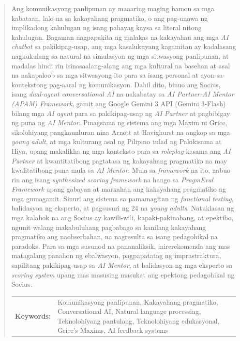 \renewcommand{\abstractname}{Abstrak}
\begin{abstract}

Ang komunikasyong panlipunan ay maaaring maging hamon sa mga kabataan, lalo na sa kakayahang pragmatiko, 
o ang pag-unawa ng implikadong kahulugan ng isang pahayag kaysa sa literal nitong kahulugan. Bagaman 
nagpapakita ng malakas na kakayahan ang mga \textit{AI chatbot} sa pakikipag-usap, ang mga kasalukuyang 
kagamitan ay kadalasang nagkukulang sa natural na simulasyon ng mga sitwasyong panlipunan, at madalas 
hindi rin isinasaalang-alang ang mga kultural na basehan at asal na nakapaloob sa mga sitwasyong ito 
para sa isang personal at ayon-sa-kontekstong pag-aaral ng komunikasyon. Dahil dito, binuo ang Socius, 
isang \textit{dual-agent conversational AI} na nakabatay sa \textit{AI Partner-AI Mentor (APAM) Framework}, 
gamit ang Google Gemini 3 API (Gemini 3-Flash) bilang mga \textit{AI agent} para sa pakikipag-usap 
ng \textit{AI Partner} at pagbibigay ng puna ng \textit{AI Mentor}. Pinagsama ng sistema ang mga Maxim 
ni Grice, sikolohiyang pangkaunluran nina Arnett at Havighurst na angkop sa mga \textit{young adult}, at 
mga kulturang asal ng Pilipino tulad ng Pakikisama at Hiya, upang makalikha ng mga konteksto para 
sa \textit{roleplay} kasama ang \textit{AI Partner} at kwantitatibong pagtatasa ng kakayahang pragmatiko 
na may kwalitatibong puna mula sa \textit{AI Mentor}. Mula sa \textit{framework} na ito, nabuo rin ang 
isang \textit{synthesized scoring framework} na hango sa \textit{PragmEval Framework} upang gabayan at 
markahan ang kakayahang pragmatiko ng mga gumagamit. Sinuri ang sistema sa pamamagitan 
ng \textit{functional testing}, balidasyon ng eksperto, at pagsusuri ng 24 na \textit{young adults}. 
Natuklasan ng mga kalahok na ang Socius ay kawili-wili, kapaki-pakinabang, at epektibo, ngunit walang 
makabuluhang pagbabago sa kanilang kakayahang pragmatiko ang naobserbahan, na nagresulta sa isang pedagohikal 
na paradoks. Para sa mga susunod na pananaliksik, inirerekomenda ang mas matagalang panahon ng ebalwasyon, 
pagpapatatag ng imprastraktura, sapilitang pakikipag-usap sa \textit{AI Mentor}, at balidasyon ng mga 
eksperto sa \textit{scoring system} upang mas masusing masukat ang epektong pedagohikal ng Socius.

\begin{flushleft}
\begin{tabular}{lp{4.25in}}
\hspace{-0.5em}\textbf{Keywords:}\hspace{0.25em} & Komunikasyong panlipunan, Kakayahang pragmatiko, Conversational AI, Natural language processing, Teknolohiyang pantulong, Teknolohiyang edukasyonal, Grice's Maxims, AI feedback systems
\end{tabular}
\end{flushleft}
\end{abstract}